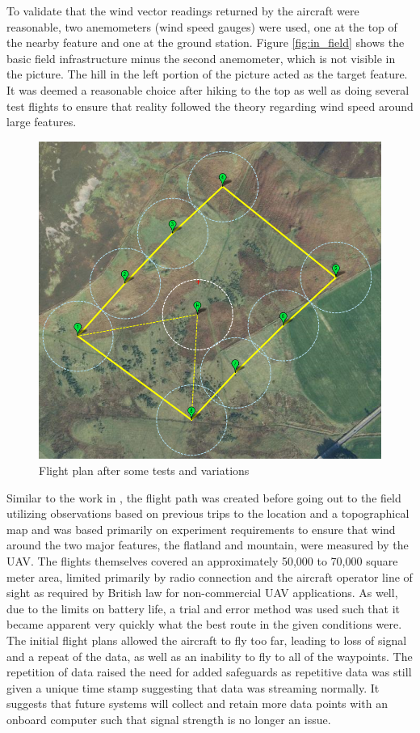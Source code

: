 \documentclass[12pt]{report}
\begin{document}
To validate that the wind vector readings returned by the aircraft were reasonable, two anemometers (wind speed gauges) were used, one at the top of the nearby feature and one at the ground station. Figure \ref{fig:in_field} shows the basic field infrastructure minus the second anemometer, which is not visible in the picture. The hill in the left portion of the picture acted as the target feature. It was deemed a reasonable choice after hiking to the top as well as doing several test flights to ensure that reality followed the theory regarding wind speed around large features.

\begin{figure}[!ht]
	\centering
	\includegraphics[scale=0.46]{flight_plan_3.png}
	\caption{Flight plan after some tests and variations}
	\label{fig:flight_plan_1}
\end{figure}

Similar to the work in \cite{Leonard10}, the flight path was created before going out to the field utilizing observations based on previous trips to the location and a topographical map and was based primarily on experiment requirements to ensure that wind around the two major features, the flatland and mountain, were measured by the UAV. The flights themselves covered an approximately 50,000 to 70,000 square meter area, limited primarily by radio connection and the aircraft operator line of sight as required by British law for non-commercial UAV applications. As well, due to the limits on battery life, a trial and error method was used such that it became apparent very quickly what the best route in the given conditions were. The initial flight plans allowed the aircraft to fly too far, leading to loss of signal and a repeat of the data, as well as an inability to fly to all of the waypoints. The repetition of data raised the need for added safeguards as repetitive data was still given a unique time stamp suggesting that data was streaming normally. It suggests that future systems will collect and retain more data points with an onboard computer such that signal strength is no longer an issue.
\end{document}
